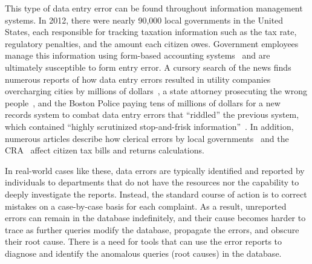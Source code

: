 

This type of data entry error can be found throughout information management systems. 
In 2012, there were nearly 90,000 local governments in the United States, each responsible for tracking taxation information such as the tax rate, regulatory penalties, and the amount each citizen owes. 
Government employees manage this information using form-based accounting systems~\cite{reutersmanagement} and are ultimately susceptible to form entry error.  
A cursory search of the news finds numerous reports of how data entry errors resulted in utility companies overcharging cities by millions of dollars~\cite{powercompany}, a state attorney prosecuting the wrong people~\cite{mosby}, and the Boston Police paying tens of millions of dollars for a new records system to combat data entry errors that ``riddled'' the previous system, which contained ``highly scrutinized stop-and-frisk information''~\cite{bostonpolice}.
In addition, numerous articles describe how clerical errors by local governments~\cite{twinfalls} and the CRA~\cite{cra} affect citizen tax bills and returns calculations.

% 
In real-world cases like these,
data errors are typically identified and reported by
individuals to departments that do not have the resources nor the
capability to deeply investigate the reports. Instead, the standard
course of action is to correct mistakes on a case-by-case basis for
each complaint. As a result, unreported errors can remain in the
database indefinitely, and their cause becomes harder to trace as
further queries modify the database, propagate the errors, and obscure
their root cause. There is a need for tools that can use the error
reports to diagnose and identify the anomalous queries (root causes)
in the database.



